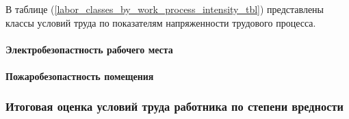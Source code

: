 В таблице (\ref{labor_classes_by_work_process_intensity_tbl}) представлены классы
условий труда по показателям напряженности трудового процесса.

\paragraph{Электробезопастность рабочего места}

\paragraph{Пожаробезопастность помещения}



\subsubsection{Итоговая оценка условий труда работника по степени вредности}
